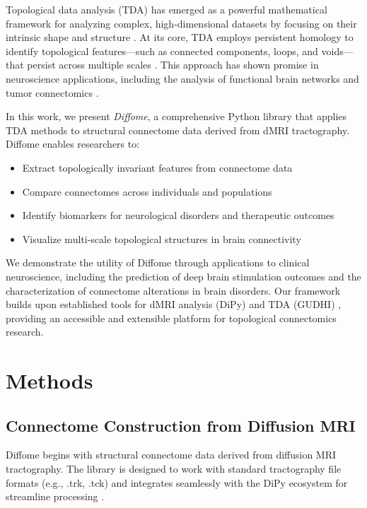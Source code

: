 \documentclass[12pt,a4paper]{article}
\begin{document}
Topological data analysis (TDA) has emerged as a powerful mathematical framework for analyzing complex, high-dimensional datasets by focusing on their intrinsic shape and structure \citep{carlsson2009topology}. At its core, TDA employs persistent homology to identify topological features—such as connected components, loops, and voids—that persist across multiple scales \citep{edelsbrunner2002topological}. This approach has shown promise in neuroscience applications, including the analysis of functional brain networks \citep{petri2014homological} and tumor connectomics \citep{bhattacharya2024analyzing}.

In this work, we present \textit{Diffome}, a comprehensive Python library that applies TDA methods to structural connectome data derived from dMRI tractography. Diffome enables researchers to:
\begin{itemize}
    \item Extract topologically invariant features from connectome data
    \item Compare connectomes across individuals and populations
    \item Identify biomarkers for neurological disorders and therapeutic outcomes
    \item Visualize multi-scale topological structures in brain connectivity
\end{itemize}

We demonstrate the utility of Diffome through applications to clinical neuroscience, including the prediction of deep brain stimulation outcomes \citep{anderson2021structural, mehta2025comparison} and the characterization of connectome alterations in brain disorders. Our framework builds upon established tools for dMRI analysis (DiPy) \citep{garyfallidis2014dipy} and TDA (GUDHI) \citep{maria2014gudhi}, providing an accessible and extensible platform for topological connectomics research.

\section{Methods}

\subsection{Connectome Construction from Diffusion MRI}

Diffome begins with structural connectome data derived from diffusion MRI tractography. The library is designed to work with standard tractography file formats (e.g., .trk, .tck) and integrates seamlessly with the DiPy ecosystem for streamline processing \citep{garyfallidis2014dipy}.
\end{document}
